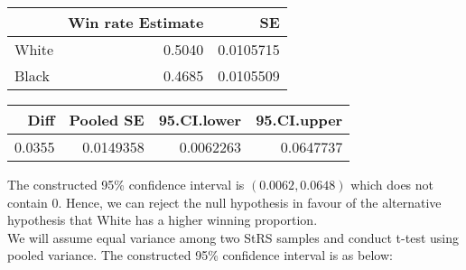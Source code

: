 \documentclass[11pt,]{article}
\begin{document}
\begin{table}[h] \centering  
\begin{tabular}{l|r|r}
\hline
  & Win rate Estimate & SE\\
\hline
White & 0.5040 & 0.0105715\\
\hline
Black & 0.4685 & 0.0105509\\
\hline
\end{tabular} \hspace{1cm} \centering  
\begin{tabular}{r|r|r|r}
\hline
Diff & Pooled SE & 95.CI.lower & 95.CI.upper\\
\hline
0.0355 & 0.0149358 & 0.0062263 & 0.0647737\\
\hline
\end{tabular} \end{table}

The constructed 95\% confidence interval is \((0.0062, 0.0648)\) which
does not contain 0. Hence, we can reject the null hypothesis in favour
of the alternative hypothesis that White has a higher winning
proportion.\\
\newline We will assume equal variance among two StRS samples and
conduct t-test using pooled variance. The constructed 95\% confidence
interval is as below: \newline
\end{document}
